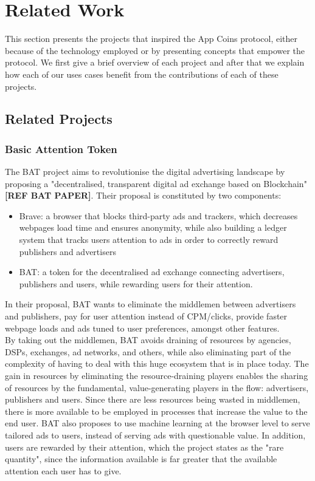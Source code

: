 \section{Related Work}

This section presents the projects that inspired the App Coins protocol, either because of the technology employed or by presenting concepts that empower the protocol. We first give a brief overview of each project and after that we explain how each of our uses cases benefit from the contributions of each of these projects.

\subsection{Related Projects}
\subsubsection{Basic Attention Token}

The BAT project aims to revolutionise the digital advertising landscape by proposing a "decentralised, transparent digital ad exchange based on Blockchain" \textbf{[REF BAT PAPER]}. Their proposal is constituted by two components:
\begin{itemize}
	\item Brave: a browser that blocks third-party ads and trackers, which decreases webpages load time and ensures anonymity, while also building a ledger system that tracks users attention to ads in order to correctly reward publishers and advertisers
	\item BAT: a token for the decentralised ad exchange connecting advertisers, publishers and users, while rewarding users for their attention.
\end{itemize}

In their proposal, BAT wants to eliminate the middlemen between advertisers and publishers, pay for user attention instead of CPM/clicks, provide faster webpage loads and ads tuned to user preferences, amongst other features. \\

By taking out the middlemen, BAT avoids draining of resources by agencies, DSPs, exchanges, ad networks, and others, while also eliminating part of the complexity of having to deal with this huge ecosystem that is in place today. The gain in resources by eliminating the resource-draining players enables the sharing of resources by the fundamental, value-generating  players in the flow: advertisers, publishers and users. Since there are less resources being wasted in middlemen, there is more available to be employed in processes that increase the value to the end user. BAT also proposes to use machine learning at the browser level to serve tailored ads to users, instead of serving ads with questionable value. In addition, users are rewarded by their attention, which the project states as the "rare quantity", since the information available is far greater that the available attention each user has to give. \\

